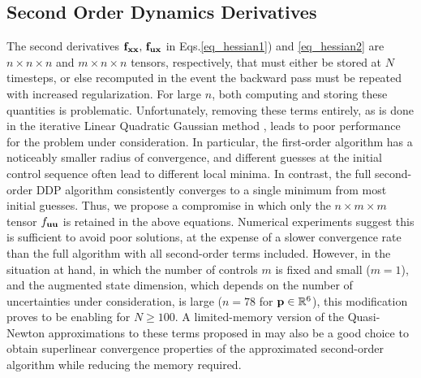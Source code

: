 \subsection{Second Order Dynamics Derivatives}\label{Sec:DDP_Simplification}
The second derivatives $\mathbf{f}_{\mathbf{x}\mathbf{x}},\, \mathbf{f}_{\mathbf{u}\mathbf{x}}$ in Eqs.\eqref{eq_hessian1}) and \eqref{eq_hessian2} are $n\times n\times n$ and $m\times n\times n$ tensors, respectively, that must either be stored at $N$ timesteps, or else recomputed in the event the backward pass must be repeated with increased regularization. For large $n$, both computing and storing these quantities is problematic. Unfortunately, removing these terms entirely, as is done in the iterative Linear Quadratic Gaussian method \cite{iLQG}, leads to poor performance for the problem under consideration. In particular, the first-order algorithm has a noticeably smaller radius of convergence, and different guesses at the initial control sequence often lead to different local minima. In contrast, the full second-order DDP algorithm consistently converges to a single minimum from most initial guesses. Thus, we propose a compromise in which only the $n\times m \times m$ tensor $f_{\mathbf{u}\mathbf{u}}$ is retained in the above equations. Numerical experiments suggest this is sufficient to avoid poor solutions, at the expense of a slower convergence rate than the full algorithm with all second-order terms included. However, in the situation at hand, in which the number of controls $m$ is fixed and small ($ m=1 $), and the augmented state dimension, which depends on the number of uncertainties under consideration, is large ($n=78$ for $\mathbf{p}\in\mathbb{R}^6$), this modification proves to be enabling for $N\geq 100$. A limited-memory version of the Quasi-Newton approximations to these terms proposed in \cite{QNDDP} may also be a good choice to obtain superlinear convergence properties of the approximated second-order algorithm while reducing the memory required. 

